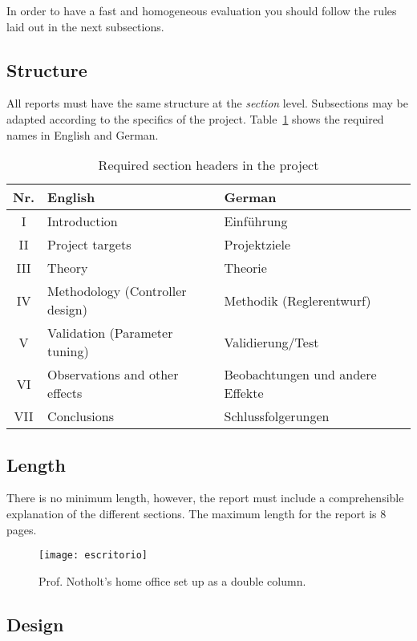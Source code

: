 \documentclass[a4paper, 10pt]{IEEEtran}
\begin{document}
	In order to have a fast and homogeneous evaluation you should follow the rules laid out in the next subsections.
	
	\subsection{Structure}
	
	All reports must have the same structure at the \emph{section} level. Subsections may be adapted according to the specifics of the project. Table~\ref{tbl:sections} shows the required names in English and German.
	
	\begin{table}[hb]
		\caption{Required section headers in the project}\label{tbl:sections}
		\centering
		\begin{tabular}{cp{12em}p{12em}}
			\hline
			\bfseries Nr. & \bfseries English & \bfseries German\\
			\hline
			I & Introduction & Einführung\\
			II & Project targets & Projektziele \\
			III & Theory & Theorie \\
			IV & Methodology (Controller design) & Methodik (Reglerentwurf)\\
			V & Validation (Parameter tuning) & Validierung/Test \\
			VI & Observations and other effects & Beobachtungen und andere Effekte\\
			VII & Conclusions & Schlussfolgerungen\\
			\hline
		\end{tabular}
	\end{table}
	

	\subsection{Length}
	
	There is no minimum length, however, the report must include a comprehensible explanation of the different sections. The maximum length for the report is 8 pages.
	
	\begin{figure*}[hbt]
		\texttt{[image: escritorio]}
		\caption{Prof. Notholt's home office set up as a double column.}\label{fig:doublecolumn}
	\end{figure*}
	
	\subsection{Design}
	
\end{document}
